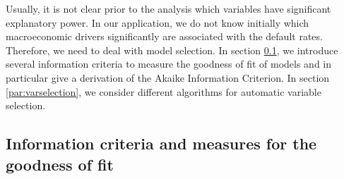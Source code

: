 \documentclass[a4paper, 11pt]{scrreprt}
\begin{document}
Usually, it is not clear prior to the analysis which variables have significant explanatory power. In our application, we do not know initially which macroeconomic drivers significantly are associated with the default rates. Therefore, we need to deal with model selection. In section \ref{par:informationcriteria}, we introduce several information criteria to measure the goodness of fit of models and in particular give a derivation of the Akaike Information Criterion. In section \ref{par:varselection}, we consider different algorithms for automatic variable selection.

\subsection{Information criteria and measures for the goodness of fit}\label{par:informationcriteria}
\end{document}

